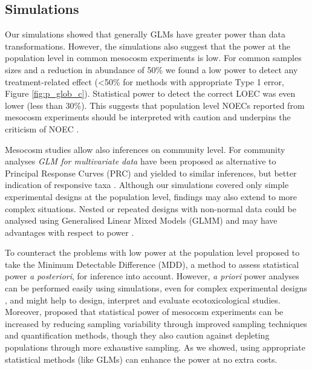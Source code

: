 \documentclass[twocolumn, natbib]{svjour3}
\begin{document}
\subsection{Simulations}
Our simulations showed that generally GLMs have greater power than data transformations.
However, the simulations also suggest that the power at the population level in common mesocosm experiments is low.
For common samples sizes and a reduction in abundance of 50\% we found a low power to detect any treatment-related effect (\textless 50\% for methods with appropriate Type 1 error, Figure \ref{fig:p_glob_c}).
Statistical power to detect the correct LOEC was even lower (less than 30\%).
This suggests that population level NOECs reported from mesocosm experiments should be interpreted with caution and underpins the criticism of NOEC \citep{laskowski_good_1995,landis_well_2011}.

Mesocosm studies allow also inferences on community level. 
For community analyses \emph{GLM for multivariate data} \citep{warton_distance-based_2012} have been proposed as alternative to Principal Response Curves (PRC) and yielded to similar inferences, but better indication of responsive taxa \citep{szocs_analysing_2015}. 
Although our simulations covered only simple experimental designs at the population level, findings may also extend to more complex situations. 
Nested or repeated designs with non-normal data could be analysed using Generalised Linear Mixed Models (GLMM) and may have advantages with respect to power \citep{stroup_rethinking_2014}.

To counteract the problems with low power at the population level \citet{brock_minimum_2015} proposed to take the Minimum Detectable Difference (MDD), a method to assess statistical power \emph{a posteriori}, for inference into account.
However, \emph{a priori} power analyses can be performed easily using simulations, even for complex experimental designs \citep{johnson_power_2014}, and might help to design, interpret and evaluate ecotoxicological studies.
Moreover, \citet{brock_minimum_2015} proposed that statistical power of mesocosm experiments can be increased by reducing sampling variability through improved sampling techniques and quantification methods, though they also caution against depleting populations through more exhaustive sampling.
As we showed, using appropriate statistical methods (like GLMs) can enhance the power at no extra costs.
\end{document}
